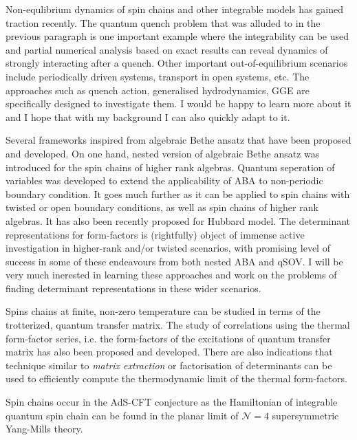 \documentclass[a4paper, 11pt, DIV=15]{scrarticle}
\begin{document}
\begin{description}[left=0pt]
\item[Out of equlibrium problems] Non-equlibrium dynamics of spin chains and other integrable models has gained traction recently. The quantum quench problem that was alluded to in the previous paragraph is one important example where the integrability can be used and partial numerical analysis based on exact results can reveal dynamics of strongly interacting after a quench.
Other important out-of-equilibrium scenarios include periodically driven systems, transport in open systems, etc. The approaches such as quench action, generalised hydrodynamics, GGE are specifically designed to investigate them. I would be happy to learn more about it and I hope that with my background I can also quickly adapt to it.
\item[Higher rank / twisted spin chains] Several frameworks inspired from algebraic Bethe ansatz that have been proposed and developed.
On one hand, nested version of algebraic Bethe ansatz was introduced for the spin chains of higher rank algebras.
Quantum seperation of variables was developed to extend the applicability of ABA to non-periodic boundary condition. It goes much further as it can be applied to spin chains with twisted or open boundary conditions, as well as spin chains of higher rank algebras.
It has also been recently proposed for Hubbard model.
The determinant representations for form-factors is (rightfully) object of immense active investigation in higher-rank and/or twisted scenarios, with promising level of success in some of these endeavours from both nested ABA and qSOV.
I will be very much inerested in learning these approaches and work on the problems of finding determinant representations in these wider scenarios.
\item[Finite temperature case]
Spins chains at finite, non-zero temperature can be studied in terms of the trotterized, quantum transfer matrix.
The study of correlations using the thermal form-factor series, i.e. the form-factors of the excitations of quantum transfer matrix has also been proposed and developed. There are also indications that technique similar to \emph{matrix extraction} or factorisation of determinants can be used to efficiently compute the thermodynamic limit of the thermal form-factors.
\item[Integrable spin chains in AdS-CFT duality]
Spin chains occur in the AdS-CFT conjecture as the Hamiltonian of integrable quantum spin chain can be found in the planar limit of $\mathcal{N}=4$ supersymmetric Yang-Mills theory.

\end{description}
\end{document}
